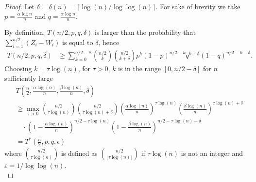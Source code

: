 \documentclass[english]{article}
\newcommand{\eps}{\varepsilon}
\newcommand{\1}{\textbf{1}}
\newcommand{\pp}{\frac{\alpha\log(n)}{n}}
\newcommand{\qq}{\frac{\beta\log(n)}{n}}
\begin{document}
\begin{proof}
Let $\delta=\delta(n)=\lceil \log(n)/\log\log(n) \rceil$. For sake of brevity we take $p = \frac{\alpha \log n}{n}$ and $q = \frac{\alpha \log n}{n}$. 
 
By definition, $T(n/2,p, q , \delta)$ is larger than the probability that $\sum_{i=1}^{n/2} (Z_i - W_i)$ is equal to $\delta$, hence  
\begin{align}
T(n/2,p, q , \delta) &\geq \sum_{k =0}^{n/2-\delta} {n/2 \choose k}{n/2 \choose k+\delta} p^k (1-p)^{n/2-k} q^{k+\delta} (1-q)^{n/2-k-\delta}.
\end{align}
Choosing $k = \tau \log(n)$, for $\tau >0$, $k$ is in the range $[0,n/2-\delta]$ for $n$ sufficiently large
\begin{align}
&   T\left(\frac{n}2,\pp, \qq , \delta \right) \\
& \geq   \max_{\tau >0} \binom{n/2}{\tau \log(n)} \binom{n/2}{\tau \log(n) +\delta}\left(\pp \right)^{\tau \log(n)}\left( \qq \right)^{\tau \log(n) +\delta} \\
&  \quad \cdot \left(1-\pp\right)^{n/2 - \tau \log(n)} \left(1-\qq\right)^{n/2 - \tau \log(n)-\delta} \label{start}  \\
&= T^* \left( \frac{n}{2}, p,q,\epsilon \right)
\end{align}
where ${n/2 \choose  \tau \log(n)}$ is defined as ${n/2 \choose  \lfloor \tau \log(n) \rfloor }$ if $\tau \log(n)$ is not an integer and $\eps=1/\log \log(n)$.\\


\end{proof}
\end{document}
